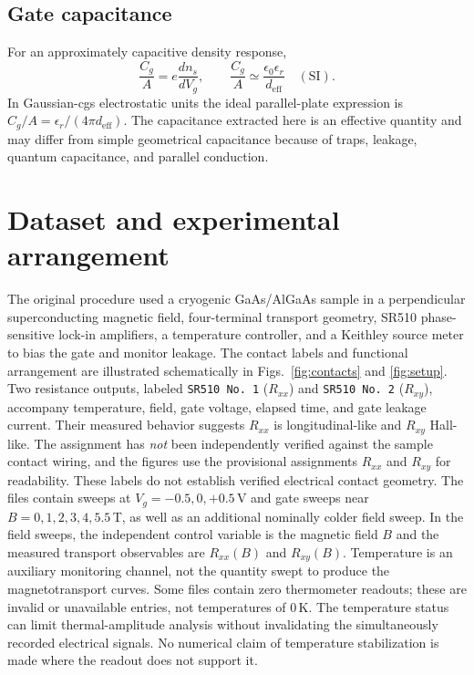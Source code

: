 \documentclass[
    aps,
    prb, 
    twocolumn, superscriptaddress,
    amsmath,
    amssymb,
    floatfix
]{revtex4-2}
\begin{document}
\subsection{Gate capacitance}
For an approximately capacitive density response,
\begin{equation}
\frac{C_g}{A}=e\frac{dn_s}{dV_g},\qquad
\frac{C_g}{A}\simeq\frac{\epsilon_0\epsilon_r}{d_{\mathrm{eff}}}\quad\mathrm{(SI)}.\label{eq:gatecap}
\end{equation}
In Gaussian-cgs electrostatic units the ideal parallel-plate expression is $C_g/A=\epsilon_r/(4\pi d_{\mathrm{eff}})$. The capacitance extracted here is an effective quantity and may differ from simple geometrical capacitance because of traps, leakage, quantum capacitance, and parallel conduction.

\section{Dataset and experimental arrangement}
The original procedure used a cryogenic GaAs/AlGaAs sample in a perpendicular superconducting magnetic field, four-terminal transport geometry, SR510 phase-sensitive lock-in amplifiers, a temperature controller, and a Keithley source meter to bias the gate and monitor leakage\cite{datta1995}. The contact labels and functional arrangement are illustrated schematically in Figs.~\ref{fig:contacts} and \ref{fig:setup}. Two resistance outputs, labeled \texttt{SR510 No. 1} ($R_{xx}$) and \texttt{SR510 No. 2} ($R_{xy}$), accompany temperature, field, gate voltage, elapsed time, and gate leakage current. Their measured behavior suggests $R_{xx}$ is longitudinal-like and $R_{xy}$ Hall-like. The assignment has \emph{not} been independently verified against the sample contact wiring, and the figures use the provisional assignments $R_{xx}$ and $R_{xy}$ for readability. These labels do not establish verified electrical contact geometry. The files contain sweeps at $V_g=-0.5,0,+0.5\,$V and gate sweeps near $B=0,1,2,3,4,5.5\,$T, as well as an additional nominally colder field sweep. In the field sweeps, the independent control variable is the magnetic field $B$ and the measured transport observables are $R_{xx}(B)$ and $R_{xy}(B)$. Temperature is an auxiliary monitoring channel, not the quantity swept to produce the magnetotransport curves. Some files contain zero thermometer readouts; these are invalid or unavailable entries, not temperatures of $0\,$K. The temperature status can limit thermal-amplitude analysis without invalidating the simultaneously recorded electrical signals. No numerical claim of temperature stabilization is made where the readout does not support it.
\end{document}
